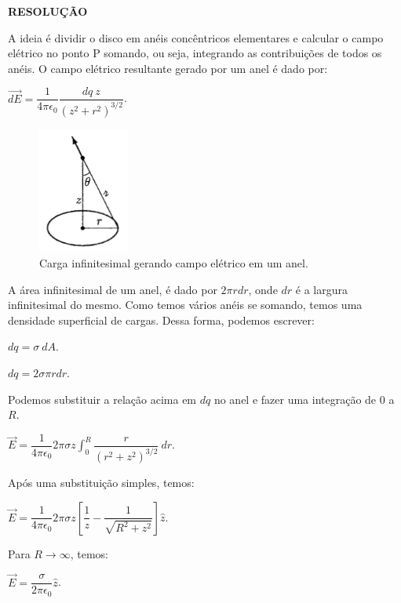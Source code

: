\documentclass[11pt,a4paper]{article}
\begin{document}
\begin{enumerate}
\textbf{RESOLUÇÃO}

A ideia é dividir o disco em anéis concêntricos elementares e calcular o campo elétrico no ponto P somando, ou seja, integrando as contribuições de todos os anéis. O campo elétrico resultante gerado por um anel é dado por: 

\begin{center}
$\vec{dE} = \displaystyle\dfrac{1}{4 \pi \epsilon_0} \displaystyle\dfrac{dq \ z}{(z^2 + r^2)^{3/2}}$.
\end{center}

\begin{figure}[h]	
\centering %
\includegraphics[width=3cm]{Selection_076.jpg} 
\caption{Carga infinitesimal gerando campo elétrico em um anel.}
\end{figure}

A área infinitesimal de um anel, é dado por $2\pi r dr$, onde $dr$ é a largura infinitesimal do mesmo. Como temos vários anéis se somando, temos uma densidade superficial de cargas. Dessa forma, podemos escrever:

\begin{center}

$dq = \sigma \ dA$.

$dq = 2 \sigma \pi r dr$.

\end{center}

Podemos substituir a relação acima em $dq$ no anel e fazer uma integração de $0$ a $R$.  

\begin{center}
$\vec{E} = \displaystyle\dfrac{1}{4 \pi \epsilon_0} 2\pi \sigma z \displaystyle\int_0^R\displaystyle\dfrac{r}{(r^2 + z^2)^{3/2}} \ dr$.
\end{center}

Após uma substituição simples, temos:

\begin{center}
$\vec{E} = \displaystyle\dfrac{1}{4 \pi \epsilon_0} 2\pi \sigma z \left[\displaystyle\dfrac{1}{z} - \displaystyle\dfrac{1}{\sqrt{R^2 + z^2}}\right] \hat{z}$.
\end{center}

Para $R \to \infty$, temos:

\begin{center}
$\vec{E} = \displaystyle\dfrac{\sigma}{2 \pi \epsilon_0} \hat{z}$.
\end{center}

\end{enumerate}
	
\end{document}
